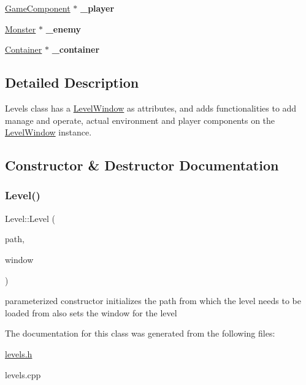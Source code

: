 \begin{DoxyCompactItemize}
\item 
\hypertarget{class_level_a0dd008af41c9a3ca0779bbaf3856e5e5}{}\label{class_level_a0dd008af41c9a3ca0779bbaf3856e5e5} 
\hyperlink{class_game_component}{Game\+Component} $\ast$ {\bfseries \+\_\+player}
\item 
\hypertarget{class_level_ad7db6f5c2cb8559da37f567219e8e22b}{}\label{class_level_ad7db6f5c2cb8559da37f567219e8e22b} 
\hyperlink{class_monster}{Monster} $\ast$ {\bfseries \+\_\+enemy}
\item 
\hypertarget{class_level_a04250fd0b458eef2ea45fffc03c26455}{}\label{class_level_a04250fd0b458eef2ea45fffc03c26455} 
\hyperlink{class_container}{Container} $\ast$ {\bfseries \+\_\+container}
\end{DoxyCompactItemize}


\subsection{Detailed Description}
Levels class has a \hyperlink{class_level_window}{Level\+Window} as attributes, and adds functionalities to add manage and operate, actual environment and player components on the \hyperlink{class_level_window}{Level\+Window} instance. 

\subsection{Constructor \& Destructor Documentation}
\hypertarget{class_level_aba4f031f3752773a8a04bf58997776b9}{}\label{class_level_aba4f031f3752773a8a04bf58997776b9} 
\subsubsection{\texorpdfstring{Level()}{Level()}}
{\footnotesize\ttfamily Level\+::\+Level (\begin{DoxyParamCaption}\item[{std\+::string}]{path,  }\item[{\hyperlink{class_level_window}{Level\+Window} $\ast$}]{window }\end{DoxyParamCaption})}

parameterized constructor initializes the path from which the level needs to be loaded from also sets the window for the level 

The documentation for this class was generated from the following files\+:\begin{DoxyCompactItemize}
\item 
\hyperlink{levels_8h}{levels.\+h}\item 
levels.\+cpp\end{DoxyCompactItemize}
